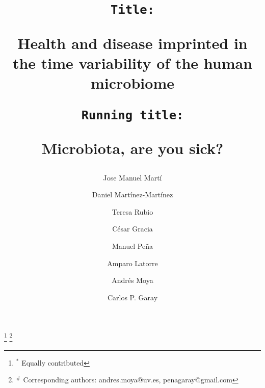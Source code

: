 \documentclass[12pt,oneside,letterpaper]{article}
\newcommand\importancename{Importance}
\newcommand{\importance}[1]{
	{
    \small
    \begin{center}
        {\bfseries \importancename\vspace{-.5em}\vspace{0pt}}
    \end{center}
    \begin{quote}
    #1
    \end{quote}
    }
}
\newcommand\wordcount{}
\begin{document}
\title{
	\vspace*{0mm} %
	\singlespacing
	\begin{flushleft}
		\texttt{\large Title:} \\
	\end{flushleft}
	\vspace*{2mm}
	Health and disease imprinted in the time variability of the human microbiome\\
	\vspace*{6mm}
	\begin{flushleft}
		\texttt{\large Running title:} \\
	\end{flushleft}
	\vspace*{0mm}
	Microbiota, are you sick?
	\vspace*{4mm}
	}

\doublespacing

\author[1,2,$*$]{Jose Manuel Martí}
\author[1,2,3,$*$]{Daniel Martínez-Martínez}
\author[1]{Teresa Rubio}
\author[1,2]{César Gracia}
\author[2]{Manuel Peña}
\author[1,3,4,5]{Amparo Latorre}
\author[1,3,4,5,\#]{Andrés Moya}
\author[1,2,\#]{Carlos P. Garay}


\date{}

\maketitle
\wordcount
\footnote[0]{$^*$ Equally contributed}
\footnote[0]{$^\#$ Corresponding authors: andres.moya@uv.es, penagaray@gmail.com}

\clearpage

\end{document}
